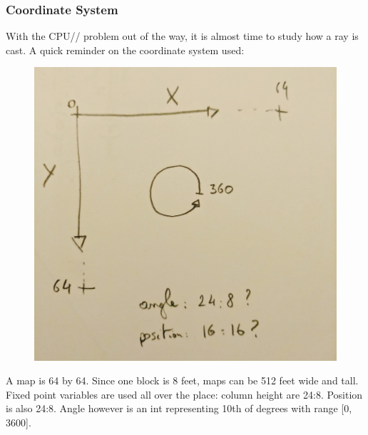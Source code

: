 \subsubsection{Coordinate System}
With the CPU// problem out of the way, it is almost time to study how a ray is cast. A quick reminder on the coordinate system used:
\begin{figure}[H]
  \centering
 \includegraphics[width=\textwidth]{imgs/drawings/coordinate_system.png}
\end{figure}
\par
A map is 64 by 64. Since one block is 8 feet, maps can be 512 feet wide and tall. Fixed point variables are used all over the place: column height are 24:8. Position is also 24:8. Angle however is an int representing 10th of degrees with range [0, 3600].

















